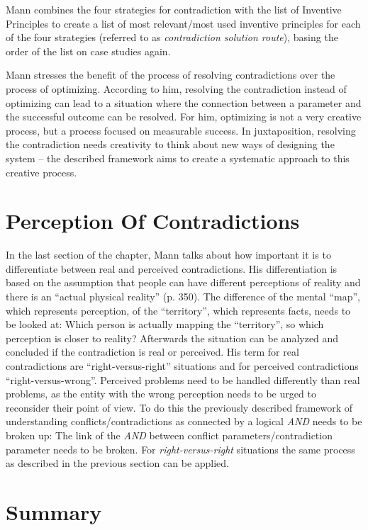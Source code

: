 \documentclass[11pt,a4paper]{article}
\begin{document}
Mann combines the four strategies for contradiction with the list of Inventive
Principles to create a list of most relevant/most used inventive principles
for each of the four strategies (referred to as \emph{contradiction solution
  route}), basing the order of the list on case studies again.

Mann stresses the benefit of the process of resolving contradictions over the
process of optimizing. According to him, resolving the contradiction instead
of optimizing can lead to a situation where the connection between a parameter
and the successful outcome can be resolved. For him, optimizing is not a very
creative process, but a process focused on measurable success. In
juxtaposition, resolving the contradiction needs creativity to think about new
ways of designing the system -- the described framework aims to create a
systematic approach to this creative process.

\section{Perception Of Contradictions}

In the last section of the chapter, Mann talks about how important it is to
differentiate between real and perceived contradictions. His differentiation
is based on the assumption that people can have different perceptions of
reality and there is an \enquote{actual physical reality} (p. 350). The
difference of the mental \enquote{map}, which represents perception, of the
\enquote{territory}, which represents facts, needs to be looked at: Which
person is actually mapping the \enquote{territory}, so which perception is
closer to reality?  Afterwards the situation can be analyzed and concluded if
the contradiction is real or perceived. His term for real contradictions are
\enquote{right-versus-right} situations and for perceived contradictions
\enquote{right-versus-wrong}. Perceived problems need to be handled
differently than real problems, as the entity with the wrong perception needs
to be urged to reconsider their point of view. To do this the previously
described framework of understanding conflicts/contradictions as connected by
a logical \emph{AND} needs to be broken up: The link of the \emph{AND} between
conflict parameters/contradiction parameter needs to be broken. For
\emph{right-versus-right} situations the same process as described in the
previous section can be applied.

\section{Summary}
\end{document}
